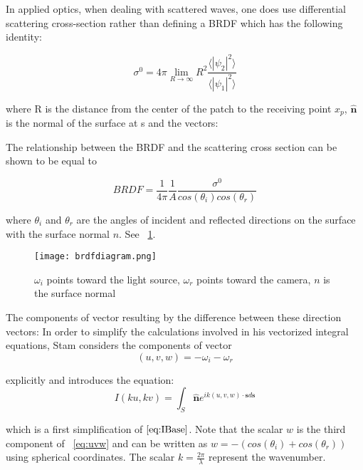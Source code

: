 In applied optics, when dealing with scattered waves, one does use differential scattering cross-section rather than defining a BRDF which has the following identity: 

\begin{equation}
    \sigma^0 = 4 \pi \lim_{R \to \infty} R^2 \frac{\langle \left|\psi_2\right|^2\rangle}{\langle \left|\psi_1\right|^2\rangle}
\end{equation}

where R is the distance from the center of the patch to the receiving point $x_p$, $\hat{\mathbf{n}}$ is the normal of the surface at s and the vectors:

The relationship between the BRDF and the scattering cross section can be shown to be equal to 

\begin{equation}
 BRDF = \frac{1}{4\pi}\frac{1}{A}\frac{\sigma^0}{cos(\theta_i)cos(\theta_r)}
 \label{fig:crossscateringbrdfrelationship} 
\end{equation}

where $\theta_i$ and $\theta_r$ are the angles of incident and reflected directions on the surface with the surface normal $n$. See ~\ref{fig:geometricsetup}.

\begin{figure}[ht]
  \centering
  \texttt{[image: brdfdiagram.png]}
  \caption{$\omega_i$ points toward the light source, $\omega_r$ points toward the camera, $n$ is the surface normal}
  \label{fig:geometricsetup}  
\end{figure}

The components of vector resulting by the difference between these direction vectors:
In order to simplify the calculations involved in his vectorized integral equations, Stam considers the components of vector 
\begin{equation}
  (u,v,w) = -\omega_i - \omega_r 
\label{eq:uvw}
\end{equation}

explicitly and introduces the equation: 
\begin{equation}
  I(ku,kv) = \int_{S} \hat{\mathbf{n}} e^{ik(u,v,w) \cdot \mathbf{s} d\mathbf{s}} 
\label{eq:Istart}
\end{equation}

which is a first simplification of $\ref{eq:IBase}$. Note that the scalar $w$ is the third component of ~\ref{eq:uvw} and can be written as $w = -(cos(\theta_i)+cos(\theta_r))$ using spherical coordinates. The scalar $k=\frac{2\pi}{\lambda}$ represent the wavenumber.


